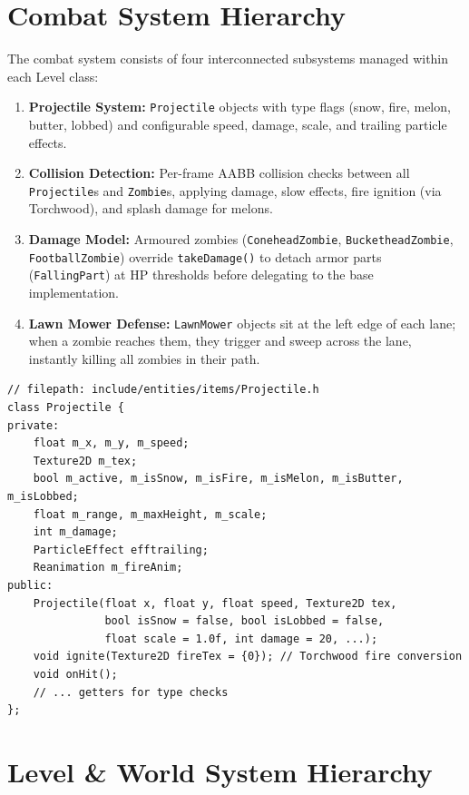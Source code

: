 \documentclass[12pt,a4paper]{article}
\begin{document}
\section{Combat System Hierarchy}
The combat system consists of four interconnected subsystems managed within each Level class:
\begin{enumerate}[leftmargin=2em]
    \item \textbf{Projectile System:} \texttt{Projectile} objects with type flags (snow, fire, melon, butter, lobbed) and configurable speed, damage, scale, and trailing particle effects.
    \item \textbf{Collision Detection:} Per-frame AABB collision checks between all \texttt{Projectile}s and \texttt{Zombie}s, applying damage, slow effects, fire ignition (via Torchwood), and splash damage for melons.
    \item \textbf{Damage Model:} Armoured zombies (\texttt{ConeheadZombie}, \texttt{BucketheadZombie}, \texttt{FootballZombie}) override \texttt{takeDamage()} to detach armor parts (\texttt{FallingPart}) at HP thresholds before delegating to the base implementation.
    \item \textbf{Lawn Mower Defense:} \texttt{LawnMower} objects sit at the left edge of each lane; when a zombie reaches them, they trigger and sweep across the lane, instantly killing all zombies in their path.
\end{enumerate}
\begin{lstlisting}[caption={Projectile class --- multi-type projectile with physics}]
// filepath: include/entities/items/Projectile.h
class Projectile {
private:
    float m_x, m_y, m_speed;
    Texture2D m_tex;
    bool m_active, m_isSnow, m_isFire, m_isMelon, m_isButter, m_isLobbed;
    float m_range, m_maxHeight, m_scale;
    int m_damage;
    ParticleEffect efftrailing;
    Reanimation m_fireAnim;
public:
    Projectile(float x, float y, float speed, Texture2D tex,
               bool isSnow = false, bool isLobbed = false,
               float scale = 1.0f, int damage = 20, ...);
    void ignite(Texture2D fireTex = {0}); // Torchwood fire conversion
    void onHit();
    // ... getters for type checks
};
\end{lstlisting}
\section{Level \& World System Hierarchy}
\end{document}
